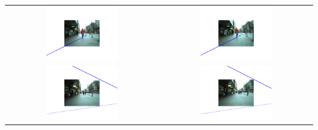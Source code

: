 \begin{framed}
\begin{center}
\begin{tabular}{cc}
\includegraphics[width=0.49\textwidth]{epipolarExtremeLeft1}\label{fig:cp04_epipolarExtremeLeft1} &
\includegraphics[width=0.49\textwidth]{epipolarExtremeRight1}\label{fig:cp04_epipolarExtremeRight1} \\
\includegraphics[width=0.49\textwidth]{epipolarExtremeLeft2}\label{fig:cp04_epipolarExtremeLeft2} &
\includegraphics[width=0.49\textwidth]{epipolarExtremeRight2}\label{fig:cp04_epipolarExtremeRight2} \\
\end{tabular}
\label{fig:cp04_epipolarExtreme}
\end{center}



\end{framed}
